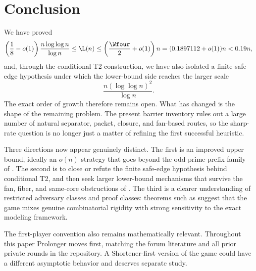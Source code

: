 \section{Conclusion}\label{sec:conclusion}

We have proved
\[
\left(\frac18-o(1)\right)\frac{n\log\log n}{\log n}
\le
\L(n)
\le
\left(\frac{\Wfour}{2}+o(1)\right)n
=
(0.1897112+o(1))n
<
0.19n,
\]
and, through the conditional T2 construction, we have also isolated a finite
safe-edge hypothesis under which the lower-bound side reaches the larger scale
\[
\frac{n(\log\log n)^2}{\log n}.
\]
The exact order of growth therefore remains open.  What has changed is the
shape of the remaining problem.  The present barrier inventory rules out a
large number of natural separator, packet, closure, and fan-based routes, so
the sharp-rate question is no longer just a matter of refining the first
successful heuristic.

Three directions now appear genuinely distinct.  The first is an improved upper
bound, ideally an $o(n)$ strategy that goes beyond the odd-prime-prefix family
of .  The second is to close or
refute the finite safe-edge hypothesis behind conditional T2, and then seek
larger lower-bound mechanisms that survive the fan, fiber, and same-core
obstructions of .  The third is a clearer
understanding of restricted adversary classes and proof classes: theorems such
as  suggest
that the game mixes genuine combinatorial rigidity with strong sensitivity to
the exact modeling framework.

The first-player convention also remains mathematically relevant.  Throughout
this paper Prolonger moves first, matching the forum literature and all prior
private rounds in the repository.  A Shortener-first version of the game could
have a different asymptotic behavior and deserves separate study.
